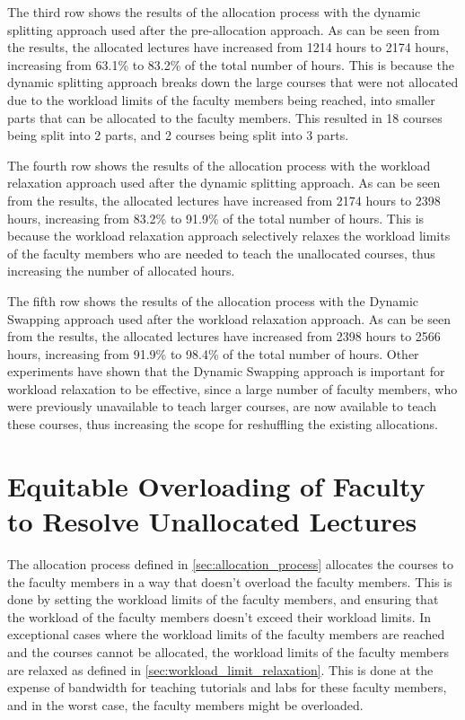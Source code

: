 The third row shows the results of the allocation process with the dynamic splitting approach used after the pre-allocation approach. As can be seen from the results, the allocated lectures have increased from 1214 hours to 2174 hours, increasing from 63.1\% to 83.2\% of the total number of hours. This is because the dynamic splitting approach breaks down the large courses that were not allocated due to the workload limits of the faculty members being reached, into smaller parts that can be allocated to the faculty members. This resulted in 18 courses being split into 2 parts, and 2 courses being split into 3 parts.

The fourth row shows the results of the allocation process with the workload relaxation approach used after the dynamic splitting approach. As can be seen from the results, the allocated lectures have increased from 2174 hours to 2398 hours, increasing from 83.2\% to 91.9\% of the total number of hours. This is because the workload relaxation approach selectively relaxes the workload limits of the faculty members who are needed to teach the unallocated courses, thus increasing the number of allocated hours.

The fifth row shows the results of the allocation process with the Dynamic Swapping approach used after the workload relaxation approach. As can be seen from the results, the allocated lectures have increased from 2398 hours to 2566 hours, increasing from 91.9\% to 98.4\% of the total number of hours. Other experiments have shown that the Dynamic Swapping approach is important for workload relaxation to be effective, since a large number of faculty members, who were previously unavailable to teach larger courses, are now available to teach these courses, thus increasing the scope for reshuffling the existing allocations.

\section{Equitable Overloading of Faculty to Resolve Unallocated Lectures}

The allocation process defined in \autoref{sec:allocation_process} allocates the courses to the faculty members in a way that doesn't overload the faculty members. This is done by setting the workload limits of the faculty members, and ensuring that the workload of the faculty members doesn't exceed their workload limits. In exceptional cases where the workload limits of the faculty members are reached and the courses cannot be allocated, the workload limits of the faculty members are relaxed as defined in \autoref{sec:workload_limit_relaxation}. This is done at the expense of bandwidth for teaching tutorials and labs for these faculty members, and in the worst case, the faculty members might be overloaded.

